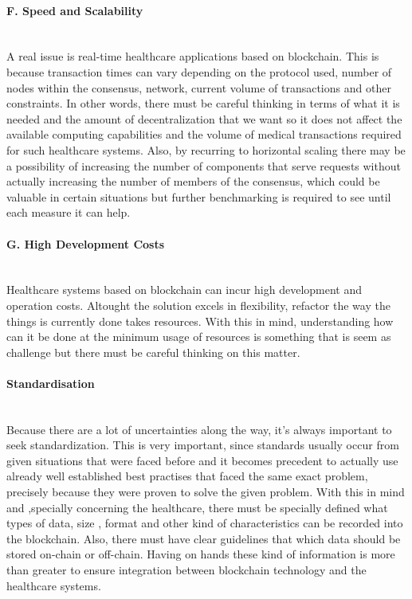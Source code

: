\paragraph{F. Speed and Scalability} \mbox{}\\
A real issue is real-time healthcare applications based on blockchain. This is because transaction times can vary depending on the protocol used, number of nodes within the consensus, network, current volume of transactions and other constraints. In other words, there must be careful thinking in terms of what it is needed and the amount of decentralization that we want so it does not affect the available computing capabilities and the volume of medical transactions required for such healthcare systems. Also, by recurring to horizontal scaling there may be a possibility of increasing the number of components that serve requests without actually increasing the number of members of the consensus, which could be valuable in certain situations but further benchmarking is required to see until each measure it can help.

\paragraph{G. High Development Costs} \mbox{}\\
Healthcare systems based on blockchain can incur high development and operation costs. Altought the solution excels in flexibility, refactor the way the things is currently done takes resources. With this in mind, understanding how can it be done at the minimum usage of resources is something that is seem as challenge but there must be careful thinking on this matter.

\paragraph{Standardisation} \mbox{}\\
Because there are a lot of uncertainties along the way, it's always important to seek standardization. This is very important, since standards usually occur from given situations that were faced before and it becomes precedent to actually use already well established best practises that faced the same exact problem, precisely because they were proven to solve the given problem. With this in mind and ,specially concerning the healthcare, there must be specially defined what types of data, size , format and other kind of characteristics can be recorded into the blockchain. Also, there must have clear guidelines that which data should be stored on-chain or off-chain. Having on hands these kind of information is more than greater to ensure integration between blockchain technology and the healthcare systems.

